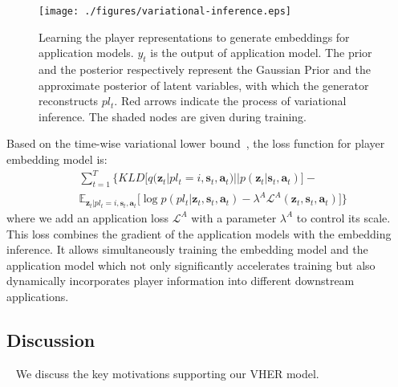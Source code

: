 \documentclass{article}
\newcommand{\expect}{\mathbb{E}}
\newcommand{\latentvariables}{\mathbf{z}}
\newcommand{\inference}{q}
\newcommand{\generation}{p}
\newcommand{\state}{\mathbf{s}}
\newcommand{\action}{\mathbf{a}}
\newcommand{\player}{pl}
\newcommand{\pindex}{i}
\newcommand{\prior}{p}
\begin{document}
\begin{figure}[t]
    \centering
    \texttt{[image: ./figures/variational-inference.eps]}
    \caption{Learning the player representations to generate embeddings for application models. $y_{t}$ is the output of application model. The prior and the posterior respectively represent the Gaussian Prior and the approximate posterior of latent variables, with which the generator reconstructs $\player_{t}$. Red arrows indicate the process of variational inference. The shaded nodes are given during training.
    } 
    \label{fig:model-struct}
\end{figure} 
Based on the time-wise variational lower bound~\cite{ChungKDGCB15}, the loss function for player embedding model is:
\vspace{-0.05in}
\begin{align} \label{eq:loss}
        &\sum_{t=1}^{T}\Big\{ KLD\Big[\inference(\latentvariables_{t} |\player_{t} = \pindex,\state_{t},\action_{t})||\prior(\latentvariables_{t}|\state_{t},\action_{t})\Big]-\\
        &\expect_{\latentvariables_{t}|\player_{t}=i,\state_{t},\action_{t}}
        \Big[\log\generation(\player_{t}|\latentvariables_{t},\state_{t},\action_{t}) -\lambda^{A}
        \mathcal{L}^{A}( \latentvariables_{t},\state_{t},\action_{t})\Big]
        \Big\} \nonumber
\end{align}
\noindent where we add an application loss $\mathcal{L}^{A}$ with a parameter $\lambda^{A}$ to control its scale. This loss combines the gradient of the application models with the embedding inference. It allows simultaneously training the embedding model and the application model which not only significantly accelerates training but also dynamically incorporates player information into different downstream applications. 

\subsection{Discussion}~\label{sec:Interpretation}
\noindent We discuss the key motivations supporting our VHER model. 
\end{document}
